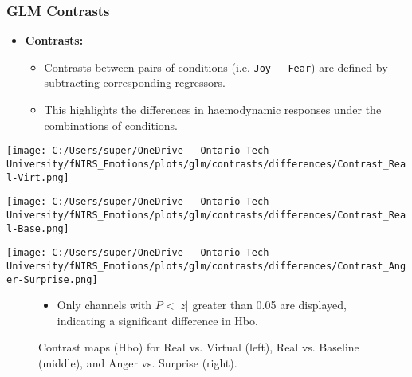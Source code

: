 \documentclass{beamer}
\begin{document}
\begin{frame}
    \frametitle{GLM Contrasts}
    \begin{itemize}
        \item \textbf{Contrasts:}
        \begin{itemize}
            \item Contrasts between pairs of conditions (i.e. \texttt{Joy - Fear}) are defined by subtracting corresponding regressors. 
            \item This highlights the differences in haemodynamic responses under the combinations of conditions.
        \end{itemize}
    \end{itemize}
    \begin{minipage}[t]{0.3\textwidth}
        \vspace{-\baselineskip}
        \texttt{[image: C:/Users/super/OneDrive - Ontario Tech University/fNIRS\_Emotions/plots/glm/contrasts/differences/Contrast\_Real-Virt.png]}
    \end{minipage}
    \begin{minipage}[t]{0.3\textwidth}
        \vspace{-\baselineskip}
        \texttt{[image: C:/Users/super/OneDrive - Ontario Tech University/fNIRS\_Emotions/plots/glm/contrasts/differences/Contrast\_Real-Base.png]}
    \end{minipage}
    \begin{minipage}[t]{0.3\textwidth}
        \vspace{-\baselineskip}
        \texttt{[image: C:/Users/super/OneDrive - Ontario Tech University/fNIRS\_Emotions/plots/glm/contrasts/differences/Contrast\_Anger-Surprise.png]}
    \end{minipage}
    \begin{figure}
        \caption{Contrast maps (Hbo) for Real vs. Virtual (left), Real vs. Baseline (middle), and Anger vs. Surprise (right).}
        \begin{itemize}
            \item Only channels with \(P < |z|\) greater than 0.05 are displayed, indicating a significant difference in Hbo.
        \end{itemize}
    \end{figure}
\end{frame}
\end{document}
